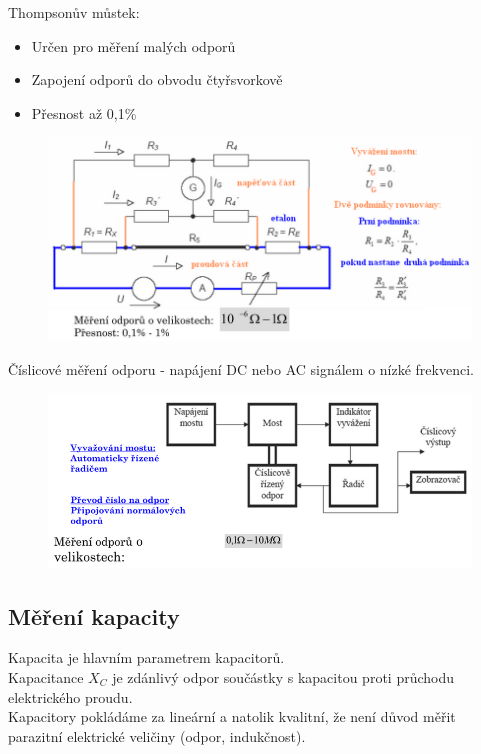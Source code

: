 Thompsonův můstek:
\begin{itemize}
    \item Určen pro měření malých odporů
    \item Zapojení odporů do obvodu čtyřsvorkově
    \item Přesnost až 0,1\%
\end{itemize}
\begin{figure}[h!]
    \centering
    \includegraphics[scale = 0.4]{images/Thompson.png}
\end{figure}

Číslicové měření odporu - napájení DC nebo AC signálem o nízké frekvenci.\\
\begin{figure}[h!]
    \centering
    \includegraphics[scale = 0.5]{images/CislMerOdp.png}
\end{figure}

\subsection{Měření kapacity}
Kapacita je hlavním parametrem kapacitorů.\\
Kapacitance \(X_C\) je zdánlivý odpor součástky s kapacitou proti průchodu elektrického proudu.\\
Kapacitory pokládáme za lineární a natolik kvalitní, že není důvod měřit parazitní elektrické veličiny (odpor, indukčnost).\\
